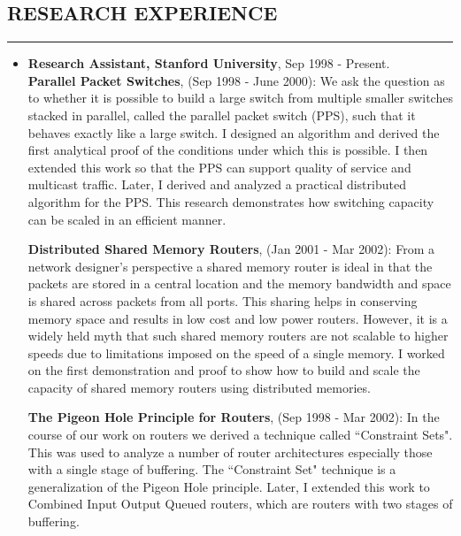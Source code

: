 \documentclass[10pt,a4]{article}
\begin{document}
\begin{small}
\subsection*{RESEARCH EXPERIENCE}
\hrule
\vspace{0.2cm}
\begin{itemize}
\item {\bf Research Assistant, Stanford University}, Sep 1998 - Present. \\
{\bf Parallel Packet Switches}, (Sep 1998 - June 2000): We ask the question as to whether it is possible to build a large switch
from multiple smaller switches stacked in parallel, called the parallel packet switch (PPS), 
such that it behaves exactly like a large switch. I designed an algorithm and derived the
first analytical proof of the conditions under which this is possible. I then extended 
this work so that the PPS can support quality of service and multicast traffic. Later, I derived
and analyzed a practical distributed algorithm for the PPS. This research demonstrates how switching capacity can be scaled in an efficient
manner.

\vspace{0.1cm}
{\bf Distributed Shared Memory Routers}, (Jan 2001 - Mar 2002): From a network designer's
perspective a shared memory router is ideal in that the packets
are stored in a central location and the memory bandwidth and space is shared across
packets from all ports. This sharing helps in conserving memory space and results in low cost
and low power routers. However, it is a widely held myth that such shared memory routers are not
scalable to higher speeds due to limitations imposed on the speed of a single memory. I worked 
on the first demonstration and proof to show how to build and scale the capacity of 
shared memory routers using distributed memories.  

\vspace{0.1cm}
{\bf The Pigeon Hole Principle for Routers}, (Sep 1998 - Mar 2002): In the course of our
work on routers we derived a technique called ``Constraint Sets". This was used to
analyze a number of router architectures especially those with a single stage of
buffering. The ``Constraint Set" technique is a generalization of the
Pigeon Hole principle. Later, I extended this work to Combined Input Output Queued
routers, which are routers with two stages of buffering.


\end{itemize}
\end{small}
\end{document}
